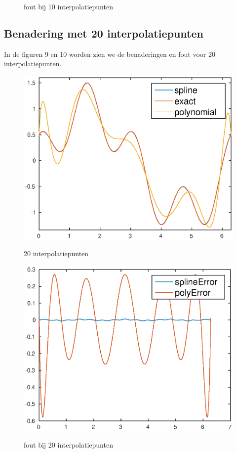 \documentclass[]{article}
\begin{document}
\begin{figure}[H]
\begin{minipage}{0.5\textwidth}
  \label{opgave3_N10_error.eps}
\caption{fout bij 10 interpolatiepunten}
\end{minipage}
\end{figure}

\subsection*{Benadering met 20 interpolatiepunten}

In de figuren 9 en 10 worden zien we de benaderingen en fout voor 20 interpolatiepunten.
\begin{figure}[H] 
\centering
\begin{minipage}{0.5\textwidth}
\centering %
 \includegraphics[width=1\textwidth]{opgave3_N20.eps}
   \label{fig:gull}
\caption{20 interpolatiepunten}
\end{minipage}\hfill
\begin{minipage}{0.5\textwidth}
\centering
\includegraphics[width=1\textwidth]{opgave3_N20_error.eps}
  \label{fig:opgave3N20_error}
\caption{fout bij 20 interpolatiepunten}
\end{minipage}
\end{figure}
\end{document}
